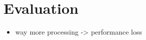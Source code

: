 \chapter{Evaluation}


\begin{itemize}
  \item way more processing -> performance loss
\end{itemize}